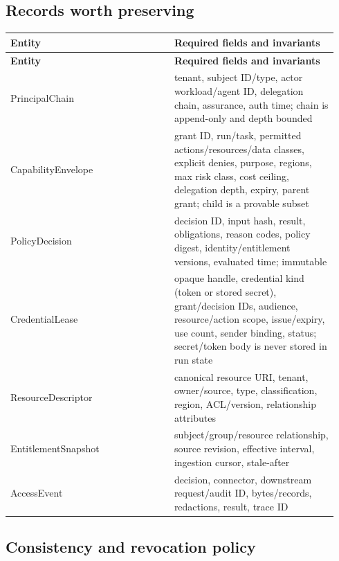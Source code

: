 \subsection{Records worth preserving}

\BookTableStart
\small
\begin{longtable}{@{}Y{0.4700\linewidth}Y{0.4700\linewidth}@{}}
\color{white}\bfseries \textbf{Entity} & \color{white}\bfseries \textbf{Required fields and invariants} \\
\endfirsthead
{}
\color{white}\bfseries \textbf{Entity} & \color{white}\bfseries \textbf{Required fields and invariants} \\
\endhead
PrincipalChain & tenant, subject ID/type, actor workload/agent ID, delegation chain, assurance, auth time; chain is append-only and depth bounded \\
CapabilityEnvelope & grant ID, run/task, permitted actions/resources/data classes, explicit denies, purpose, regions, max risk class, cost ceiling, delegation depth, expiry, parent grant; child is a provable subset \\
PolicyDecision & decision ID, input hash, result, obligations, reason codes, policy digest, identity/entitlement versions, evaluated time; immutable \\
CredentialLease & opaque handle, credential kind (token or stored secret), grant/decision IDs, audience, resource/action scope, issue/expiry, use count, sender binding, status; secret/token body is never stored in run state \\
ResourceDescriptor & canonical resource URI, tenant, owner/source, type, classification, region, ACL/version, relationship attributes \\
EntitlementSnapshot & subject/group/resource relationship, source revision, effective interval, ingestion cursor, stale-after \\
AccessEvent & decision, connector, downstream request/audit ID, bytes/records, redactions, result, trace ID \\
\end{longtable}
\BookTableEnd

\subsection{Consistency and revocation policy}

